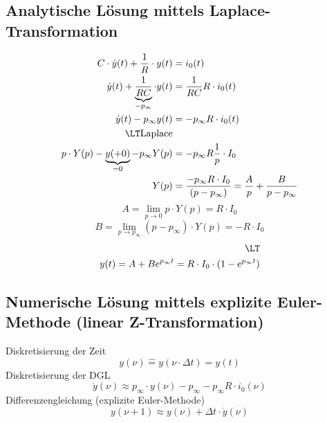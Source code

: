 
\subsection{Analytische Lösung mittels Laplace-Transformation}
\begin{equation}
\begin{split}
C\cdot\dot{y}(t) + \frac{1}{R}\cdot y(t) &= i_0(t)\\
\dot{y}(t) + \underbrace{\frac{1}{RC}}_{-p_\infty}\cdot y(t) &= \frac{1}{RC}R\cdot i_0(t)\\
\dot{y}(t) - p_\infty y(t) &= -p_\infty R\cdot i_0(t)\\
\LT \text{Laplace}\\
p\cdot Y(p) - \underbrace{y(+0)}_{=0} - p_\infty Y(p) &= -p_\infty R\frac{1}{p}\cdot I_0\\
Y(p) &= \frac{-p_\infty R\cdot I_0}{(p-p_\infty)} = \frac{A}{p} + \frac{B}{p-p_\infty}
\end{split}
\end{equation}
\begin{equation}
A = \lim\limits_{p\rightarrow 0} p\cdot Y(p) = R\cdot I_0
\end{equation}
\begin{equation}
B = \lim\limits_{p\rightarrow p_\infty} (p-p_\infty)\cdot Y(p) = -R\cdot I_0
\end{equation}
\begin{equation}
\begin{split}
\LT\\
y(t) = A + B e^{p_\infty t} = R\cdot I_0\cdot (1-e^{p_\infty t})
\end{split}
\end{equation}

\subsection{Numerische Lösung mittels explizite Euler-Methode (linear Z-Transformation)}
Diskretisierung der Zeit 
\begin{equation}
y(\nu)\hat{=} y(\nu\cdot\Delta t) = y(t)
\end{equation}
Diskretisierung der DGL 
\begin{equation}
\dot{y}(\nu)\approx p_\infty\cdot y(\nu) - p_\infty - p_\infty R\cdot i_0(\nu)
\end{equation}
Differenzengleichung (explizite Euler-Methode)
\begin{equation}
y(\nu+1)\approx y(\nu) + \Delta t\cdot\dot{y}(\nu)
\end{equation}

